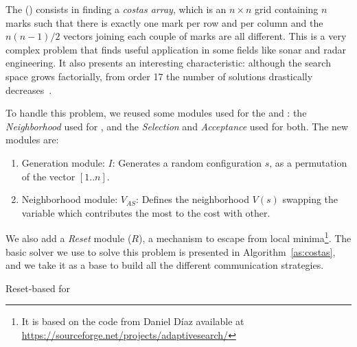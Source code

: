 The \carrp{} (\CARRP) consists in finding a \textit{costas array}, which is an $n\times n$ grid containing $n$ marks such that there is exactly one mark per row and per column and the $n(n-1)/2$ vectors joining each couple of marks are all different. This is a very complex problem that finds useful application in some fields like sonar and radar engineering. It also presents an interesting characteristic: although the search space grows factorially, from order 17 the number of solutions drastically decreases~\cite{Drakakis2006}.

To handle this problem, we reused some modules used for the \sgp{} and \nqp: the {\it Neighborhood} \om{} used for \nq{}, and the \textit{Selection} and \textit{Acceptance} \oms{} used for both. The new modules are: 

\begin{enumerate}
	\item Generation module:
	\subitem $I$: Generates a random configuration $s$, as a permutation of the vector $[1..n]$. 
	\item Neighborhood module:
	\subitem $V_{AS}$: Defines the neighborhood $V\left(s\right)$ swapping the variable which contributes the most to the cost with other.
\end{enumerate}

We also add a {\it Reset} module ($R$), a mechanism to escape from local minima\footnote{It is based on the code from Daniel D\'{i}az available at \href{https://sourceforge.net/projects/adaptivesearch/}{https://sourceforge.net/projects/adaptivesearch/}}. The basic solver we use to solve this problem is presented in Algorithm~\ref{as:costas}, and we take it as a base to build all the different communication strategies.  

\begin{algorithm}[H]
\dontprintsemicolon
\SetNoline
{}
\caption{Reset-based \as{} for \CARRP}\label{as:costas}
\end{algorithm}


